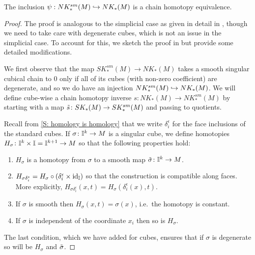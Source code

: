 \begin{proposition}\label{P: singular smooth cubes}
	The inclusion $\psi: NK^{sm}_*(M) \hookrightarrow NK_*(M)$ is a chain homotopy equivalence.
\end{proposition}

\begin{proof}
	The proof is analogous to the simplicial case as given in detail in \cite[Theorem 18.7]{Lee13}, though we need to take care with degenerate cubes, which is not an issue in the simplicial case.
	To account for this, we sketch the proof in \cite{Lee13} but provide some detailed modifications.

	We first observe that the map $SK^{sm}_*(M) \to NK_*(M)$ takes a smooth singular cubical chain to $0$ only if all of its cubes (with non-zero coefficient) are degenerate, and so we do have an injection $NK^{sm}_*(M) \hookrightarrow NK_*(M)$.
	We will define cube-wise a chain homotopy inverse $s \colon NK_*(M) \to NK^{sm}_*(M)$ by starting with a map $\tilde s \colon SK_*(M) \to SK^{sm}_*(M)$ and passing to quotients.

	Recall from \cref{S: homology is homology} that we write $\delta_i^\epsilon$ for the face inclusions of the standard cubes.
	If $\sigma \colon \mathbb{I}^k \to M$ is a singular cube, we define homotopies $H_\sigma \colon \mathbb{I}^k \times \mathbb{I} = \mathbb{I}^{k+1} \to M$ so that the following properties hold:
	\begin{enumerate}
		\item\label{I: smooth} $H_\sigma$ is a homotopy from $\sigma$ to a smooth map $\tilde \sigma \colon \mathbb{I}^k \to M$.

		\item\label{I: faces} $H_{\sigma \delta_i^\epsilon} = H_\sigma \circ (\delta_i^\epsilon \times \mathrm{id}_{\mathbb{I}})$ so that the construction is compatible along faces.
		More explicitly, $H_{\sigma \delta_i^\epsilon}(x,t) = H_\sigma(\delta_i^\epsilon(x),t)$.

		\item If $\sigma$ is smooth then $H_{\sigma}(x,t) = \sigma(x)$, i.e.\ the homotopy is constant.

		\item\label{I: degen} If $\sigma$ is independent of the coordinate $x_i$ then so is $H_\sigma$.
	\end{enumerate}

	The last condition, which we have added for cubes, ensures that if $\sigma$ is degenerate so will be $H_\sigma$ and $\tilde \sigma$.


\end{proof}

